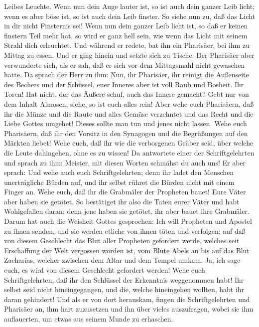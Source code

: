 Leibes Leuchte. Wenn nun dein Auge lauter ist, so ist auch dein ganzer
Leib licht; wenn es aber böse ist, so ist auch dein Leib finster.
 So siehe nun zu, daß das Licht in dir nicht Finsternis
sei!  Wenn nun dein ganzer Leib licht ist, so daß er
keinen finstern Teil mehr hat, so wird er ganz hell sein, wie wenn das
Licht mit seinem Strahl dich erleuchtet.  Und während er
redete, bat ihn ein Pharisäer, bei ihm zu Mittag zu essen. Und er ging
hinein und setzte sich zu Tische.  Der Pharisäer aber
verwunderte sich, als er sah, daß er sich vor dem Mittagsmahl nicht
gewaschen hatte.  Da sprach der Herr zu ihm: Nun, ihr
Pharisäer, ihr reinigt die Außenseite des Bechers und der Schüssel, euer
Inneres aber ist voll Raub und Bosheit.  Ihr Toren! Hat
nicht, der das Äußere schuf, auch das Innere gemacht? 
Gebt nur von dem Inhalt Almosen, siehe, so ist euch alles rein!
 Aber wehe euch Pharisäern, daß ihr die Münze und die
Raute und alles Gemüse verzehntet und das Recht und die Liebe Gottes
umgehet! Dieses sollte man tun und jenes nicht lassen. 
Wehe euch Pharisäern, daß ihr den Vorsitz in den Synagogen und die
Begrüßungen auf den Märkten liebet!  Wehe euch, daß ihr
wie die verborgenen Gräber seid, über welche die Leute dahingehen, ohne
es zu wissen!  Da antwortete einer der Schriftgelehrten
und sprach zu ihm: Meister, mit diesen Worten schmähst du auch uns!
 Er aber sprach: Und wehe auch euch Schriftgelehrten;
denn ihr ladet den Menschen unerträgliche Bürden auf, und ihr selbst
rühret die Bürden nicht mit einem Finger an.  Wehe euch,
daß ihr die Grabmäler der Propheten bauet! Eure Väter aber haben sie
getötet.  So bestätiget ihr also die Taten eurer Väter
und habt Wohlgefallen daran; denn jene haben sie getötet, ihr aber bauet
ihre Grabmäler.  Darum hat auch die Weisheit Gottes
gesprochen: Ich will Propheten und Apostel zu ihnen senden, und sie
werden etliche von ihnen töten und verfolgen;  auf daß
von diesem Geschlecht das Blut aller Propheten gefordert werde, welches
seit Erschaffung der Welt vergossen worden ist,  vom
Blute Abels an bis auf das Blut Zacharias, welcher zwischen dem Altar
und dem Tempel umkam. Ja, ich sage euch, es wird von diesem Geschlecht
gefordert werden!  Wehe euch Schriftgelehrten, daß ihr
den Schlüssel der Erkenntnis weggenommen habt! Ihr selbst seid nicht
hineingegangen, und die, welche hineingehen wollten, habt ihr daran
gehindert!  Und als er von dort herauskam, fingen die
Schriftgelehrten und Pharisäer an, ihm hart zuzusetzen und ihn über
vieles auszufragen,  wobei sie ihm auflauerten, um etwas
aus seinem Munde zu erhaschen.

